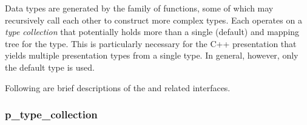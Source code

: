 Data types are generated by the  family of functions,
some of which may recursively call each other to construct more complex types.
Each operates on a \emph{type collection} that potentially holds more than a
single (default) \CAST{} and \PRESC{} mapping tree for the type.  This is
particularly necessary for the \CORBA{} C++ presentation that yields multiple
presentation types from a single \IDL{} type.  In general, however, only the
default type is used.  

Following are brief descriptions of the  and related
interfaces.

\subsubsection{p_type_collection}

